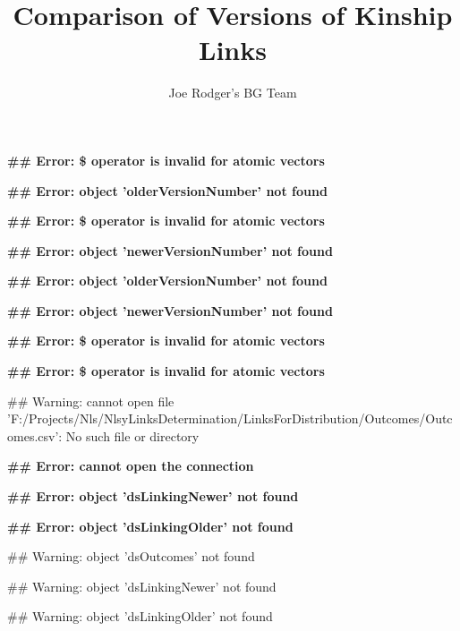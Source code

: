 \documentclass{article}\usepackage{graphicx, color}
\title{Comparison of Versions of Kinship Links}
\author{Joe Rodger's BG Team}
\makeatletter
\newenvironment{kframe}{%
 \def\at@end@of@kframe{}%
 \ifinner\ifhmode%
  \def\at@end@of@kframe{\end{minipage}}%
  \begin{minipage}{\columnwidth}%
 \fi\fi%
 \def\FrameCommand##1{\hskip\@totalleftmargin \hskip-\fboxsep
 \colorbox{shadecolor}{##1}\hskip-\fboxsep
     \hskip-\linewidth \hskip-\@totalleftmargin \hskip\columnwidth}%
 \MakeFramed {\advance\hsize-\width
   \@totalleftmargin\z@ \linewidth\hsize
   \@setminipage}}%
 {\par\unskip\endMakeFramed%
 \at@end@of@kframe}
\newenvironment{knitrout}{}{} %
\makeatother
\begin{document}
\maketitle
\setcounter{totalnumber}{8} %

\setlength{\parindent}{0pt}%




\begin{knitrout}
\color{fgcolor}\begin{kframe}


{\ttfamily\noindent\bfseries\textcolor{errorcolor}{\#\# Error: \$ operator is invalid for atomic vectors}}

{\ttfamily\noindent\bfseries\textcolor{errorcolor}{\#\# Error: object 'olderVersionNumber' not found}}

{\ttfamily\noindent\bfseries\textcolor{errorcolor}{\#\# Error: \$ operator is invalid for atomic vectors}}

{\ttfamily\noindent\bfseries\textcolor{errorcolor}{\#\# Error: object 'newerVersionNumber' not found}}

{\ttfamily\noindent\bfseries\textcolor{errorcolor}{\#\# Error: object 'olderVersionNumber' not found}}

{\ttfamily\noindent\bfseries\textcolor{errorcolor}{\#\# Error: object 'newerVersionNumber' not found}}

{\ttfamily\noindent\bfseries\textcolor{errorcolor}{\#\# Error: \$ operator is invalid for atomic vectors}}

{\ttfamily\noindent\bfseries\textcolor{errorcolor}{\#\# Error: \$ operator is invalid for atomic vectors}}

{\ttfamily\noindent\textcolor{warningcolor}{\#\# Warning: cannot open file 'F:/Projects/Nls/NlsyLinksDetermination/LinksForDistribution/Outcomes/Outcomes.csv': No such file or directory}}

{\ttfamily\noindent\bfseries\textcolor{errorcolor}{\#\# Error: cannot open the connection}}

{\ttfamily\noindent\bfseries\textcolor{errorcolor}{\#\# Error: object 'dsLinkingNewer' not found}}

{\ttfamily\noindent\bfseries\textcolor{errorcolor}{\#\# Error: object 'dsLinkingOlder' not found}}

{\ttfamily\noindent\textcolor{warningcolor}{\#\# Warning: object 'dsOutcomes' not found}}

{\ttfamily\noindent\textcolor{warningcolor}{\#\# Warning: object 'dsLinkingNewer' not found}}

{\ttfamily\noindent\textcolor{warningcolor}{\#\# Warning: object 'dsLinkingOlder' not found}}\end{kframe}
\end{knitrout}
\end{document}
